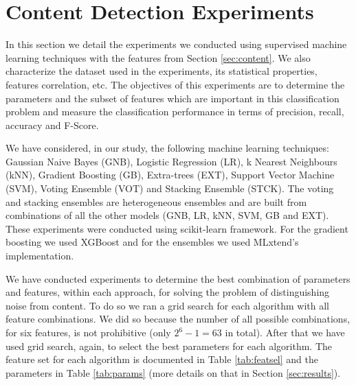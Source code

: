 \section{Content Detection Experiments}\label{sec:exp}


In this section we detail the experiments we conducted using supervised machine
learning techniques with the features from Section \ref{sec:content}. We also
characterize the dataset used in the experiments, its statistical properties,
features correlation, etc. The objectives of this experiments are to determine
the parameters and the subset of features which are important in this
classification problem and measure the classification performance in terms of
precision, recall, accuracy and F-Score.

We have considered, in our study, the following machine learning techniques:
Gaussian Naive Bayes (GNB), Logistic Regression (LR), k Nearest Neighbours
(kNN), Gradient Boosting (GB), Extra-trees (EXT), Support Vector Machine (SVM),
Voting Ensemble (VOT) and Stacking Ensemble (STCK). The voting and stacking
ensembles are heterogeneous ensembles and are built from combinations of all the
other models (GNB, LR, kNN, SVM, GB and EXT). These experiments were conducted
using scikit-learn\cite{scikit-learn} framework. For the gradient boosting we
used XGBoost\cite{Chen:2016:XST:2939672.2939785} and for the ensembles we used
MLxtend's\cite{raschkas_2018_mlxtend} implementation.

We have conducted experiments to determine the best combination of parameters
and features, within each approach, for solving the problem of distinguishing
noise from content. To do so we ran a grid search for each algorithm with all
feature combinations. We did so because the number of all possible combinations,
for six features, is not prohibitive (only $2^6 - 1  = 63$ in total).
After that we have used grid search, again, to select the best parameters for
each algorithm. The feature set for each algorithm is documented in Table
\ref{tab:featsel} and the parameters in Table \ref{tab:params} (more details on
that in Section \ref{sec:results}).

